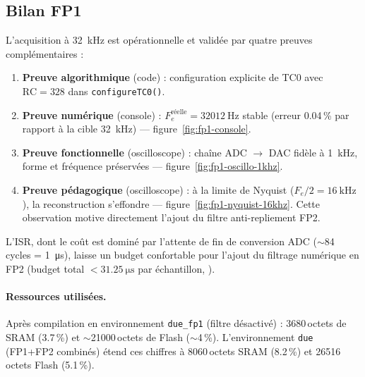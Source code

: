 \subsection{Bilan FP1}

L'acquisition à \SI{32}{\kilo\hertz} est opérationnelle et validée par quatre preuves complémentaires :

\begin{enumerate}
    \item \textbf{Preuve algorithmique} (code) : configuration explicite de TC0 avec $\text{RC}=328$ dans \texttt{configureTC0()}.
    \item \textbf{Preuve numérique} (console) : $F_e^{\text{réelle}} = \SI{32012}{\hertz}$ stable (erreur \num{0.04}\,\% par rapport à la cible \SI{32}{\kilo\hertz}) --- figure~\ref{fig:fp1-console}.
    \item \textbf{Preuve fonctionnelle} (oscilloscope) : chaîne ADC $\rightarrow$ DAC fidèle à \SI{1}{\kilo\hertz}, forme et fréquence préservées --- figure~\ref{fig:fp1-oscillo-1khz}.
    \item \textbf{Preuve pédagogique} (oscilloscope) : à la limite de Nyquist ($F_e/2 = \SI{16}{\kilo\hertz}$), la reconstruction s'effondre --- figure~\ref{fig:fp1-nyquist-16khz}. Cette observation motive directement l'ajout du filtre anti-repliement FP2.
\end{enumerate}

L'ISR, dont le coût est dominé par l'attente de fin de conversion ADC ($\sim$84 cycles = \SI{1}{\micro\second}), laisse un budget confortable pour l'ajout du filtrage numérique en FP2 (budget total $< \SI{31.25}{\micro\second}$ par échantillon, ).

\paragraph{Ressources utilisées.} Après compilation en environnement \texttt{due\_fp1} (filtre désactivé) : \num{3680}\,octets de SRAM (\num{3.7}\,\%) et $\sim$\num{21000}\,octets de Flash ($\sim$\num{4}\,\%). L'environnement \texttt{due} (FP1+FP2 combinés) étend ces chiffres à \num{8060}\,octets SRAM (\num{8.2}\,\%) et \num{26516}\,octets Flash (\num{5.1}\,\%).

\newpage
